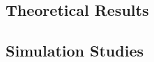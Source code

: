 \documentclass[12pt]{article}
\newcommand{\bx}{\mathbf{x}}
\begin{document}
\subsection{Theoretical Results}

\subsection{Simulation Studies}

%
%
%
%
%
%
\end{document}
